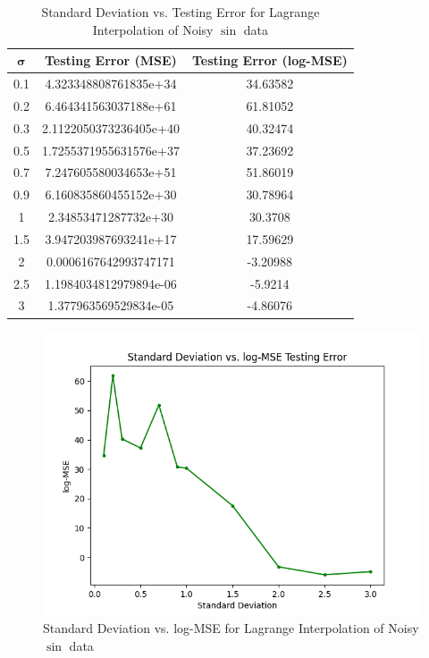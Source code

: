 \documentclass[a4paper]{article}
\theoremstyle{definition}
\newenvironment{soln}{
    \leavevmode\color{blue}\ignorespaces
}{}
\begin{document}
\begin{soln}
    \begin{table}[H]
        \centering
        \begin{tabular}{|c|c|c|}
            \hline
            $\mathbf{\sigma}$ & \textbf{Testing Error (MSE)} & \textbf{Testing Error (log-MSE)} \\
            \hline
            0.1 & 4.323348808761835e+34 & 34.63582 \\
            \hline
            0.2 & 6.464341563037188e+61 & 61.81052 \\
            \hline
            0.3 & 2.1122050373236405e+40 & 40.32474 \\
            \hline
            0.5 & 1.7255371955631576e+37 & 37.23692 \\
            \hline
            0.7 & 7.247605580034653e+51 & 51.86019 \\
            \hline
            0.9 & 6.160835860455152e+30 & 30.78964 \\
            \hline
            1 & 2.34853471287732e+30 & 30.3708\\
            \hline
            1.5 & 3.947203987693241e+17 & 17.59629 \\
            \hline
            2 & 0.0006167642993747171 & -3.20988 \\
            \hline
            2.5 & 1.1984034812979894e-06 & -5.9214 \\
            \hline
            3 & 1.377963569529834e-05 & -4.86076 \\ 
            \hline
        \end{tabular}
        \caption{Standard Deviation vs. Testing Error for Lagrange Interpolation of Noisy $\sin$ data}
        \label{tab:4}
    \end{table}

    \begin{figure}[H]
        \centering
        \includegraphics[width=0.75\linewidth]{logMSE.png}
        \caption{Standard Deviation vs. log-MSE for Lagrange Interpolation of Noisy $\sin$ data}
        \label{fig:9}
    \end{figure}
\end{soln}


\end{document}

